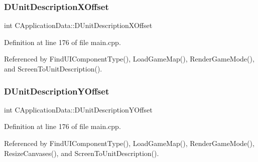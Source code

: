 \hypertarget{classCApplicationData_a5653b5d0eff32ccd540ad60f5c331c24}{}\label{classCApplicationData_a5653b5d0eff32ccd540ad60f5c331c24} 
\subsubsection{\texorpdfstring{D\+Unit\+Description\+X\+Offset}{DUnitDescriptionXOffset}}
{\footnotesize\ttfamily int C\+Application\+Data\+::\+D\+Unit\+Description\+X\+Offset\hspace{0.3cm}{\ttfamily [protected]}}



Definition at line 176 of file main.\+cpp.



Referenced by Find\+U\+I\+Component\+Type(), Load\+Game\+Map(), Render\+Game\+Mode(), and Screen\+To\+Unit\+Description().

\hypertarget{classCApplicationData_a6c60b2da482699f1d998acfe24fec332}{}\label{classCApplicationData_a6c60b2da482699f1d998acfe24fec332} 
\subsubsection{\texorpdfstring{D\+Unit\+Description\+Y\+Offset}{DUnitDescriptionYOffset}}
{\footnotesize\ttfamily int C\+Application\+Data\+::\+D\+Unit\+Description\+Y\+Offset\hspace{0.3cm}{\ttfamily [protected]}}



Definition at line 176 of file main.\+cpp.



Referenced by Find\+U\+I\+Component\+Type(), Load\+Game\+Map(), Render\+Game\+Mode(), Resize\+Canvases(), and Screen\+To\+Unit\+Description().

\hypertarget{classCApplicationData_ae0c7b5849264d7234ffb160d54650f9a}{}\label{classCApplicationData_ae0c7b5849264d7234ffb160d54650f9a} 
